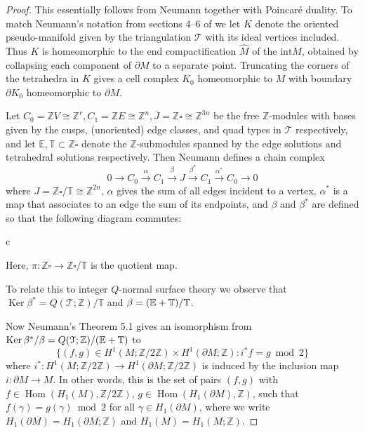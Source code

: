 \documentclass[12pt,reqno]{amsart}  %
\theoremstyle{definition}
\theoremstyle{remark}
\newcommand{\TT}{\mathbb{T}}
\newcommand{\T}{\mathcal{T}}
\def\Z{\mathbb Z}
\def\bd{\partial}
\DeclareMathOperator{\Ker}{Ker}
\let\Im\relax
\DeclareMathOperator{\Im}{Im}
\DeclareMathOperator{\Hom}{Hom}
\def\quads{\square}  %
\def\TT{\mathbb T}   %
\def\EE{\mathbb E}   %
\begin{document}
\begin{proof} 
This essentially follows from Neumann \cite[Theorem 5.1]{N} together with 
Poincar\'e duality. To match Neumann's notation from sections 4--6 
of \cite{N} we let $K$ denote the oriented pseudo-manifold given by the 
triangulation $\T$ with its ideal vertices included.
Thus $K$ is homeomorphic to the end compactification $\hat M$ of the 
$\text{int} M$, obtained by collapsing each component of  $\bd M$
to a separate point. Truncating the corners of the tetrahedra in $K$ gives 
a cell complex $K_0$ homeomorphic to $M$ with boundary
$\bd K_0$ homeomorphic to $\bd M$. 

Let  $C_0 =\Z V \cong \Z^r , C_1=\Z E \cong \Z^n ,  
\overline{J}=\Z \quads \cong\Z^{3n}$  be the free $\Z$-modules 
with bases given by the cusps, (unoriented) edge classes, and quad types 
in $\T$ respectively, and let $\EE, \TT\subset \Z \quads$ denote the 
$\Z$-submodules spanned by the edge solutions and  tetrahedral solutions
respectively.  Then Neumann defines a chain complex
$$
0 \to C_0  \xrightarrow{\alpha} C_1  \xrightarrow{\beta}  J  
\xrightarrow{\beta^*}  C_1  \xrightarrow{\alpha^*}  C_0 \to 0
$$
where $J= \Z \quads/\TT \cong \Z^{2n}$, $\alpha$ gives the sum of all 
edges incident to a vertex, $\alpha^*$ is a map that associates to an 
edge the sum of its endpoints, and $\beta$ and $\beta^*$ are defined so 
that the following diagram commutes:

\begin{center}
\begin{tabular}{c}
\xymatrix{
& \overline{J}= \Z\quads \ar[dd]_\pi \ar[dr]^F &\\
C_ 1= \Z\EE  \ar[ur]^G \ar[dr]_\beta & & C_ 1= \Z\EE\\
&J=\Z\quads/\TT \ar[ur]_{\beta^*} & 
}
\end{tabular}
\end{center}

Here, $\pi: \Z\quads  \rightarrow  \Z\quads/\TT$ is the quotient map.

To relate this  to integer  $Q$-normal surface theory we observe that 
$\Ker \beta^* = Q(\T;\Z)/\TT$ and $\Im \beta = (\EE + \TT)/\TT$.

Now Neumann's Theorem 5.1 gives an isomorphism from 
$\Ker \beta^*/\Im \beta = Q(\T;\Z)/(\EE + \TT)$ to
$$
\{ (f,g) \in  H^1(M;\Z/2\Z) \times H^1(\bd M;\Z)  :   i^* f =  g \bmod 2 \}
$$
where 
$i^*: H^1(M;\Z/2\Z) \to H^1(\bd M;\Z/2\Z) $ is induced by the inclusion 
map $i: \bd M \to M$. In other words, this is the set of pairs
$(f,g)$ with $f \in \Hom(H_1(M),\Z/2\Z)$, $g \in \Hom(H_1(\bd M),\Z)$, 
such that $f(\gamma) =g(\gamma) \bmod 2$  for all $ \gamma \in H_1(\bd M)$,
where we write  $H_1(\bd M)= H_1(\bd M; \Z)$ and $H_1(M)= H_1(M; \Z)$. 


\end{proof}
\end{document}
